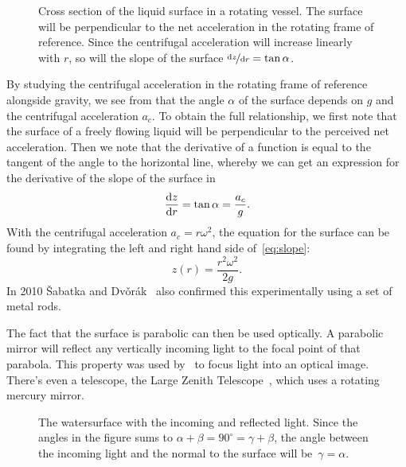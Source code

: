 \documentclass[11pt, a4paper, twocolumn, swedish, english]{article}
\begin{document}
\begin{figure}\centering
\resizebox{1\linewidth}{!}{}
\caption{Cross section of the liquid surface in a rotating vessel. The
  surface will be perpendicular to the net acceleration in the
  rotating frame of reference. Since the centrifugal acceleration will
  increase linearly with $r$, so will the slope of the surface
  ${\nicefrac{\dd{z}}{\dd{r}}=\tan\alpha}$. }
\label{fig:parabola} 
\end{figure}



By studying the centrifugal acceleration in the rotating frame of reference alongside gravity, we see from  that the 
angle $\alpha$ of the surface depends on $g$ and the centrifugal
acceleration $a_c$. To obtain the full relationship, we first note
that the surface of a freely flowing liquid will be perpendicular to
the perceived net acceleration. Then we note that the derivative of a
function is equal to the tangent of the angle to the horizontal line, whereby we can get an
expression for the derivative of the slope of the surface in
\begin{equation}\label{eq:slope}
\dv{z}{r} = \tan\alpha = \frac{a_c}{g}.
\end{equation}
With the centrifugal acceleration $a_c=r\omega^2$, the equation
for the surface can be found by integrating the left and right hand
side of~\eqref{eq:slope}: 
\begin{equation}\label{eq:parabola}
z(r)=\frac{r^2\omega^2}{2g}.
\end{equation}
In 2010 \v{S}abatka and
Dv\v{o}rák~\cite{Sabatka2010} also confirmed this experimentally using
a set of metal rods. 

The fact that the surface is parabolic can then be used optically. A
parabolic mirror will reflect any vertically incoming light to the
focal point of that parabola. This property was used
by~\cite{Berg1990} to focus light into an optical image. There's even
a telescope, the Large Zenith Telescope~\cite{LargeZenith}, which uses
a rotating mercury mirror. 

\begin{figure}\centering
\resizebox{.55\linewidth}{!}{}
\caption{The watersurface with the incoming and reflected light. Since
  the angles in the figure sums to
$\alpha+\beta= 90^\circ = \gamma+\beta$, the angle between the incoming
light and the normal to the surface will be~$\gamma=\alpha$. }
\label{fig:angles} 
\end{figure}
\end{document}
